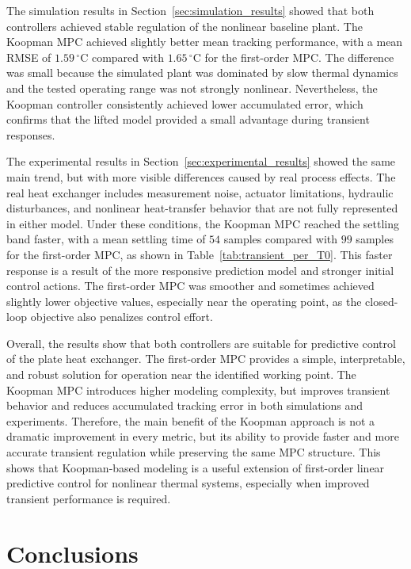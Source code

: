 The simulation results in Section~\ref{sec:simulation_results} showed that both controllers achieved stable regulation of the nonlinear baseline plant. The Koopman MPC achieved slightly better mean tracking performance, with a mean RMSE of $1.59\,^\circ$C compared with $1.65\,^\circ$C for the first-order MPC. The difference was small because the simulated plant was dominated by slow thermal dynamics and the tested operating range was not strongly nonlinear. Nevertheless, the Koopman controller consistently achieved lower accumulated error, which confirms that the lifted model provided a small advantage during transient responses.

The experimental results in Section~\ref{sec:experimental_results} showed the same main trend, but with more visible differences caused by real process effects. The real heat exchanger includes measurement noise, actuator limitations, hydraulic disturbances, and nonlinear heat-transfer behavior that are not fully represented in either model. Under these conditions, the Koopman MPC reached the settling band faster, with a mean settling time of $54$ samples compared with $99$ samples for the first-order MPC, as shown in Table~\ref{tab:transient_per_T0}. This faster response is a result of the more responsive prediction model and stronger initial control actions. The first-order MPC was smoother and sometimes achieved slightly lower objective values, especially near the operating point, as the closed-loop objective also penalizes control effort.

Overall, the results show that both controllers are suitable for predictive control of the plate heat exchanger. The first-order MPC provides a simple, interpretable, and robust solution for operation near the identified working point. The Koopman MPC introduces higher modeling complexity, but improves transient behavior and reduces accumulated tracking error in both simulations and experiments. Therefore, the main benefit of the Koopman approach is not a dramatic improvement in every metric, but its ability to provide faster and more accurate transient regulation while preserving the same MPC structure. This shows that Koopman-based modeling is a useful extension of first-order linear predictive control for nonlinear thermal systems, especially when improved transient performance is required.




\newpage
\section{Conclusions}

